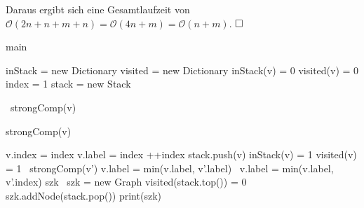 \documentclass[12pt]{scrartcl}%
\theoremstyle{nonumberplain}
\newcommand{\bO}[1]{\mathcal O(#1)}
\begin{document}
Daraus ergibt sich eine Gesamtlaufzeit von $\bO{2n + n + m + n} = \bO{4n + m} = \bO{n+m}$.
$\hfill\square$

\begin{algorithm}
	\caption{main}	
	
	\BlankLine
	
	inStack = new Dictionary\;
	visited = new Dictionary\;
	 {
		inStack(v) = 0\;
		visited(v) = 0\;	
	}
	index = 1\;
	stack = new Stack\;
	
	 {
		 {\
			strongComp(v)\;
		}
	}
\end{algorithm}

\begin{algorithm}
	\caption{strongComp(v)}
	
	v.index = index\;
	v.label = index\;
	++index\;
	stack.push(v)\;
	inStack(v) = 1\;
	visited(v) = 1\;
	 {
		 {\
			strongComp(v')\;
			v.label = min(v.label, v'.label)\;	
		}  {\
			v.label = min(v.label, v'.index)\;
		}
	}
	szk\;
	 {\
		szk = new Graph\;
		 {
			visited(stack.top()) = 0\;
			szk.addNode(stack.pop())\;
		}
		print(szk)\;
	}
\end{algorithm}
\end{document}
